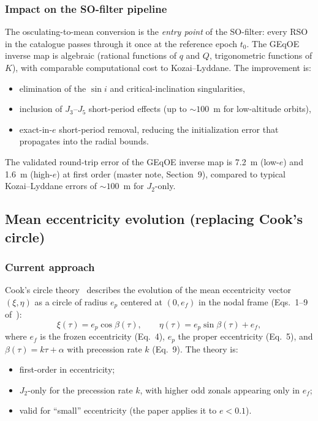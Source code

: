 \documentclass[11pt]{article}
\begin{document}
\subsubsection{Impact on the SO-filter pipeline}

The osculating-to-mean conversion is the \emph{entry point} of the SO-filter:
every RSO in the catalogue passes through it once at the reference epoch $t_0$.
The GEqOE inverse map is algebraic (rational functions of $q$ and $Q$,
trigonometric functions of $K$), with comparable computational cost to
Kozai--Lyddane. The improvement is:
\begin{itemize}
\item elimination of the $\sin i$ and critical-inclination singularities,
\item inclusion of $J_3$--$J_5$ short-period effects (up to $\sim\!100$~m for
low-altitude orbits),
\item exact-in-$e$ short-period removal, reducing the initialization error
that propagates into the radial bounds.
\end{itemize}

The validated round-trip error of the GEqOE inverse map is 7.2~m
(low-$e$) and 1.6~m (high-$e$) at first order (master note, Section~9),
compared to typical Kozai--Lyddane errors of $\sim\!100$~m for $J_2$-only.

\subsection{Mean eccentricity evolution (replacing Cook's circle)}
\label{sec:cook_replacement}

\subsubsection{Current approach}

Cook's circle theory~\cite{cook1966} describes the evolution of the mean
eccentricity vector $(\xi, \eta)$ as a circle of radius $e_p$ centered at
$(0, e_f)$ in the nodal frame (Eqs.~1--9 of~\cite{rivero2025}):
\begin{equation}
\xi(\tau) = e_p \cos\beta(\tau), \qquad
\eta(\tau) = e_p \sin\beta(\tau) + e_f,
\label{eq:cook_circle}
\end{equation}
where $e_f$ is the frozen eccentricity (Eq.~4), $e_p$ the proper
eccentricity (Eq.~5), and $\beta(\tau) = k\tau + \alpha$ with precession rate
$k$ (Eq.~9). The theory is:
\begin{itemize}
\item first-order in eccentricity;
\item $J_2$-only for the precession rate $k$, with higher odd zonals appearing
only in $e_f$;
\item valid for ``small'' eccentricity (the paper applies it to $e < 0.1$).
\end{itemize}
\end{document}
